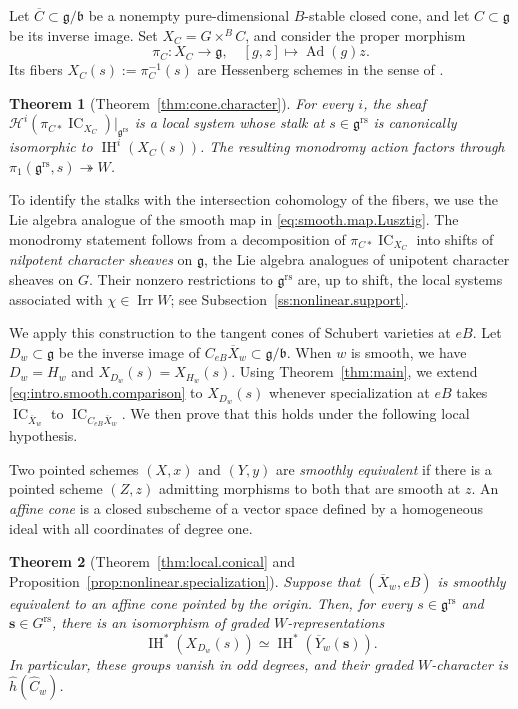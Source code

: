 \documentclass[11pt]{amsart}
\numberwithin{equation}{section}
\newtheorem{theorem}{Theorem}[section]
\theoremstyle{definition}
\newcommand\grs{\mathfrak{g}^{\mathrm{rs}}}
\def\lra{\longrightarrow }
\DeclareMathOperator{\Irr}{\mathrm{Irr}}
\DeclareMathOperator{\Ad}{\mathrm{Ad}}
\DeclareMathOperator{\IC}{\mathrm{IC}}
\def\fg{\mathfrak {g}}
\def\fb{\mathfrak {b}}
\def\Grs{G^{\mathrm{rs}}}
\DeclareMathOperator{\IH}{\mathrm{IH}}
\begin{document}
Let $\overline C\subset\fg/\fb$ be a nonempty pure-dimensional $B$-stable closed cone, and let $C\subset\fg$ be its inverse image.
Set $X_C=G\times^BC$, and consider the proper morphism
\[
\pi_C:X_C\lra\fg,\quad
[g,z]\mapsto\Ad(g)z.
\]
Its fibers $X_C(s):=\pi_C^{-1}(s)$ are Hessenberg schemes in the sense of \cite{BHL25}.

\begin{theorem}[Theorem~\ref{thm:cone.character}]
\label{thm:cone.character.intro}
For every $i$, the sheaf $\mathcal H^i(\pi_{C*}\IC_{X_C})|_{\grs}$ is a local system whose stalk at $s\in\grs$ is canonically isomorphic to $\IH^i(X_C(s))$.
The resulting monodromy action factors through $\pi_1(\grs,s)\twoheadrightarrow W$.
\end{theorem}

To identify the stalks with the intersection cohomology of the fibers, we use the Lie algebra analogue of the smooth map in \eqref{eq:smooth.map.Lusztig}.
The monodromy statement follows from a decomposition of $\pi_{C*}\IC_{X_C}$ into shifts of \emph{nilpotent character sheaves} on $\fg$, the Lie algebra analogues of unipotent character sheaves on $G$.
Their nonzero restrictions to $\grs$ are, up to shift, the local systems associated with $\chi\in\Irr W$; see Subsection~\ref{ss:nonlinear.support}.


\medskip

We apply this construction to the tangent cones of Schubert varieties at $eB$.
Let $D_w\subset\fg$ be the inverse image of $C_{eB}\overline X_w\subset\fg/\fb$.
When $w$ is smooth, we have $D_w=H_w$ and $X_{D_w}(s)=X_{H_w}(s)$.
Using Theorem~\ref{thm:main}, we extend \eqref{eq:intro.smooth.comparison} to $X_{D_w}(s)$ whenever specialization at $eB$ takes $\IC_{\overline X_w}$ to $\IC_{C_{eB}\overline X_w}$.
We then prove that this holds under the following local hypothesis.

Two pointed schemes $(X,x)$ and $(Y,y)$ are \emph{smoothly equivalent} if there is a pointed scheme $(Z,z)$ admitting morphisms to both that are smooth at $z$.
An \emph{affine cone} is a closed subscheme of a vector space defined by a homogeneous ideal with all coordinates of degree one.

\begin{theorem}[Theorem~\ref{thm:local.conical} and
Proposition~\ref{prop:nonlinear.specialization}]
\label{thm:local.conical.intro}
Suppose that $(\overline X_w,eB)$ is smoothly equivalent to an affine cone pointed by the origin.
Then, for every $s\in\grs$ and $\mathbf s\in\Grs$, there is an isomorphism of graded $W$-representations
\[
\IH^*(X_{D_w}(s))
\simeq \IH^*(\overline Y_w(\mathbf s)).
\]
In particular, these groups vanish in odd degrees, and their graded $W$-character is $\widehat h(\widehat C_w)$.
\end{theorem}
\end{document}
